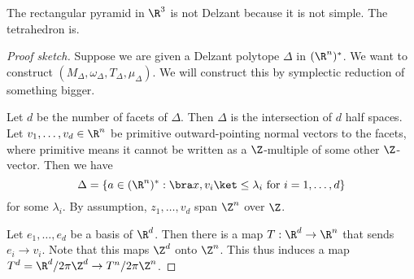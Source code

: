 \documentclass[a4paper]{article}
\begin{document}
\begin{eg}
  The rectangular pyramid in $\R^3$ is not Delzant because it is not simple. The tetrahedron is.
\end{eg}

\begin{proof}[Proof sketch]
  Suppose we are given a Delzant polytope $\Delta$ in $(\R^n)^*$. We want to construct $(M_\Delta, \omega_\Delta, T_\Delta, \mu_\Delta)$. We will construct this by symplectic reduction of something bigger. 

  Let $d$ be the number of facets of $\Delta$. Then $\Delta$ is the intersection of $d$ half spaces. Let $v_1, \ldots, v_d \in \R^n$ be primitive outward-pointing normal vectors to the facets, where primitive means it cannot be written as a $\Z$-multiple of some other $\Z$-vector. Then we have
  \[
    \Delta = \{a \in (\R^n)^* : \bra x, v_i \ket \leq \lambda_i\text{ for }i = 1, \ldots, d\}
  \]
  for some $\lambda_i$. By assumption, $z_1, \ldots, v_d$ span $\Z^n$ over $\Z$.

  Let $e_1, \ldots, e_d$ be a basis of $\R^d$. Then there is a map $T: \R^d \to \R^n$ that sends $e_i \to v_i$. Note that this maps $\Z^d$ onto $\Z^n$. This thus induces a map $T^d  = \R^d/2\pi \Z^d \to T^n / 2\pi \Z^n$.


\end{proof}
\end{document}
